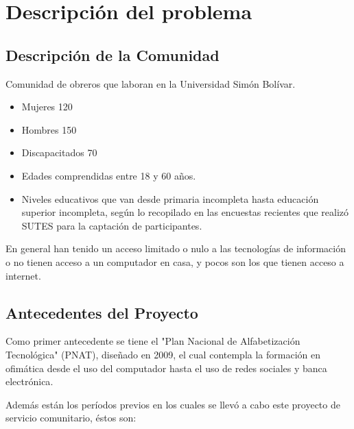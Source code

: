 	\chapter{Descripción del problema}
    
		\section{Descripción de la Comunidad}
			Comunidad de obreros que laboran en la Universidad Simón Bolívar. \cite{planSC}
            \begin{itemize}
                \item Mujeres 120
                \item Hombres 150
                \item Discapacitados 70
                \item Edades comprendidas entre 18 y 60 años. 
                \item Niveles educativos que van desde primaria incompleta hasta educación superior incompleta, según lo recopilado en las encuestas recientes que realizó SUTES para la captación de participantes.
            \end{itemize}
            
            En general han tenido un acceso limitado o nulo a las tecnologías de información o no tienen acceso a un computador en casa, y pocos son los que tienen acceso a internet.
            
		\section{Antecedentes del Proyecto}
            Como primer antecedente se tiene el "Plan Nacional de Alfabetización Tecnológica" (PNAT)\cite{PNAT}, diseñado en 2009, el cual contempla la formación en ofimática desde el  uso del computador hasta el uso de redes sociales y banca electrónica\cite{infocentro}.
            
            Además están los períodos previos en los cuales se llevó a cabo este proyecto de servicio comunitario, éstos son:
            
